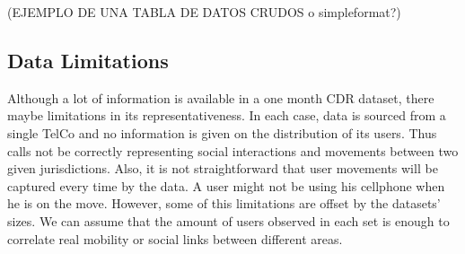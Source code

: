 (EJEMPLO DE UNA TABLA DE DATOS CRUDOS o simpleformat?)

\subsection{Data Limitations}

Although a lot of information is available in a one month CDR dataset, there maybe limitations in its representativeness. In each case, data is sourced from a single TelCo and no information is given on the distribution of its users. Thus calls not be correctly representing social interactions and movements between two given jurisdictions. Also, it is not straightforward that user movements will be captured every time by the data. A user might not be using his cellphone when he is on the move.
However, some of this limitations are offset by the datasets' sizes. We can assume that the amount of users observed in each set is enough to correlate real mobility or social links between different areas.

